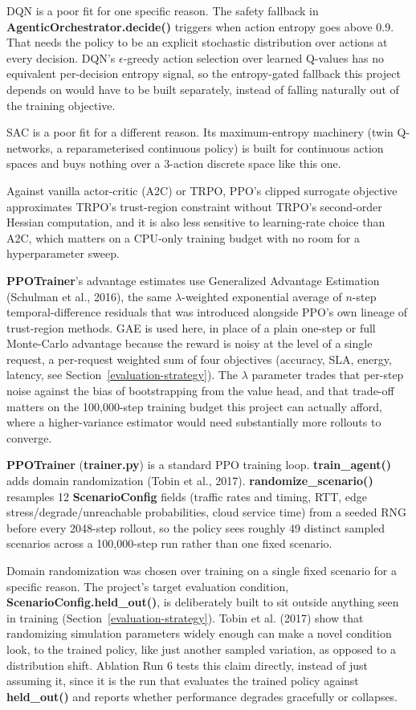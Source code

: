 DQN is a poor fit for one specific reason. The safety fallback in
\textbf{AgenticOrchestrator.decide()} triggers when
action entropy goes above 0.9. That needs the policy to be an explicit
stochastic distribution over actions at every decision. DQN's
$\epsilon$-greedy action selection over learned Q-values has no
equivalent per-decision entropy signal, so the entropy-gated fallback
this project depends on would have to be built separately, instead of
falling naturally out of the training objective.

SAC is a poor fit for a different reason. Its maximum-entropy machinery
(twin Q-networks, a reparameterised continuous policy) is built for
continuous action spaces and buys nothing over a 3-action discrete space
like this one.

Against vanilla actor-critic (A2C) or TRPO, PPO's clipped surrogate
objective approximates TRPO's trust-region constraint without TRPO's
second-order Hessian computation, and it is also less sensitive to
learning-rate choice than A2C, which matters on a CPU-only training
budget with no room for a hyperparameter sweep.

\textbf{PPOTrainer}'s advantage estimates use Generalized Advantage Estimation
(Schulman et al., 2016), the same $\lambda$-weighted exponential average
of $n$-step temporal-difference residuals that was introduced alongside
PPO's own lineage of trust-region methods. GAE is used here, in place of
a plain one-step or full Monte-Carlo advantage because the reward is
noisy at the level of a single request, a per-request weighted sum of
four objectives (accuracy, SLA, energy, latency, see Section~\ref{evaluation-strategy}). The
$\lambda$ parameter trades that per-step noise against the bias of
bootstrapping from the value head, and that trade-off matters on the
100,000-step training budget this project can actually afford, where a
higher-variance estimator would need substantially more rollouts to
converge.

\textbf{PPOTrainer} (\textbf{trainer.py}) is a standard PPO training loop.
\textbf{train\_agent()} adds domain randomization (Tobin et al., 2017).
\textbf{randomize\_scenario()} resamples 12 \textbf{ScenarioConfig} fields (traffic
rates and timing, RTT, edge stress/degrade/unreachable probabilities,
cloud service time) from a seeded RNG before every 2048-step rollout, so
the policy sees roughly 49 distinct sampled scenarios across a
100,000-step run rather than one fixed scenario.

Domain randomization was chosen over training on a single fixed
scenario for a specific reason. The project's target evaluation
condition, \textbf{ScenarioConfig.held\_out()}, is deliberately built to sit
outside anything seen in training
(Section~\ref{evaluation-strategy}). Tobin et al. (2017)
show that randomizing simulation parameters widely enough can make a
novel condition look, to the trained policy, like just
another sampled variation, as opposed to a distribution shift. Ablation
Run 6 tests this claim directly, instead of just assuming it, since it
is the run that evaluates the trained policy against \textbf{held\_out()} and
reports whether performance degrades gracefully or collapses.

